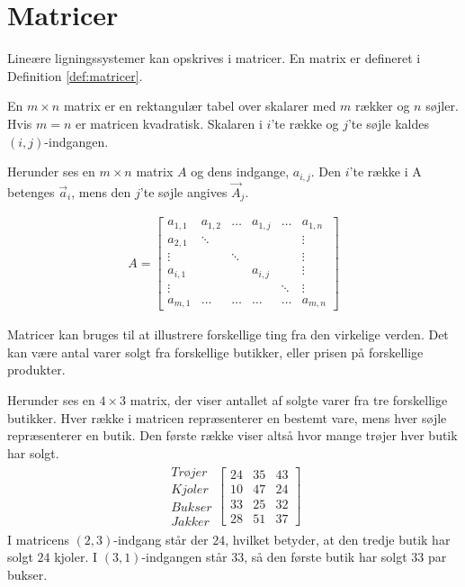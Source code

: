 \section{Matricer}
Lineære ligningssystemer kan opskrives i matricer. 
En matrix er defineret i Definition \ref{def:matricer}.

\begin{defn} [Matrix]
En $m \times n$ matrix er en rektangulær tabel over skalarer med $m$ rækker og $n$ søjler. 
Hvis $m=n$ er matricen kvadratisk. 
Skalaren i $i$'te række og $j$'te søjle kaldes $(i,j)$-indgangen.
\label{def:matricer}
\end{defn}

Herunder ses en $m \times n$ matrix $A$ og dens indgange, $a_{i,j}$. Den $i$'te række i A betenges $\vec{a}_i$, mens den $j$'te søjle angives $\vec{A}_j$.

\begin{align*}
A = \begin{bmatrix}
	a_{1,1} & a_{1,2} & \dots & a_{1,j} & \dots & a_{1,n} \\
	a_{2,1} & \ddots  &       &         &       & \vdots \\
	\vdots  &         & \ddots &        &       & \vdots \\
	a_{i,1} &         &       & a_{i,j} &       & \vdots \\
	\vdots  &         &       &         & \ddots& \vdots \\
	a_{m,1} & \dots   & \dots & \dots   & \dots & a_{m,n} 
\end{bmatrix}
\end{align*}

Matricer kan bruges til at illustrere forskellige ting fra den virkelige verden. Det kan være antal varer solgt fra forskellige butikker, eller prisen på forskellige produkter. 

\begin{eks}
Herunder ses en $4 \times 3$ matrix, der viser antallet af solgte varer fra tre forskellige butikker. Hver række i matricen repræsenterer en bestemt vare, mens hver søjle repræsenterer en butik. Den første række viser altså hvor mange trøjer hver butik har solgt.
\begin{align*}
\begin{matrix}
	Trøjer \\
	Kjoler \\
	Bukser \\
	Jakker
\end{matrix}
\begin{bmatrix}
	24 & 35 & 43 \\
	10 & 47 & 24 \\
	33 & 25 & 32 \\
	28 & 51 & 37
\end{bmatrix}
\end{align*}
I matricens $(2,3)$-indgang står der $24$, hvilket betyder, at den tredje butik har solgt $24$ kjoler. I $(3,1)$-indgangen står $33$, så den første butik har solgt $33$ par bukser. 
\end{eks}

